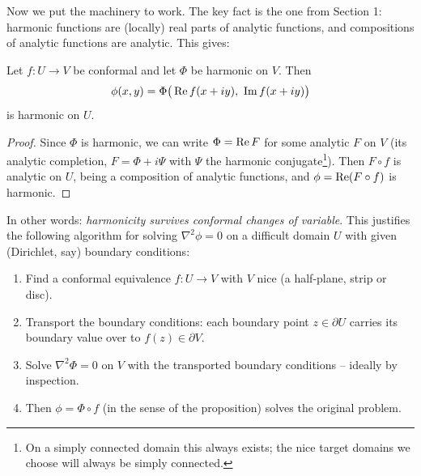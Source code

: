 \documentclass[a4paper]{scrartcl}
\begin{document}
Now we put the machinery to work. The key fact is the one from Section 1: harmonic functions are (locally) real parts of analytic functions, and compositions of analytic functions are analytic. This gives:

\begin{proposition}
	Let $f : U \to V$ be conformal and let $\Phi$ be harmonic on $V$. Then
	$$
	\phi(x, y) = \Phi\big(\re f(x + iy),\ \im f(x + iy)\big)
	$$
	is harmonic on $U$.
\end{proposition}
\begin{proof}
	Since $\Phi$ is harmonic, we can write $\Phi = \operatorname{Re} F$ for some analytic $F$ on $V$ (its analytic completion, $F = \Phi + i\Psi$ with $\Psi$ the harmonic conjugate\footnote{On a simply connected domain this always exists; the nice target domains we choose will always be simply connected.}). Then $F \circ f$ is analytic on $U$, being a composition of analytic functions, and $\phi = \operatorname{Re}(F \circ f)$ is harmonic.
\end{proof}

In other words: \emph{harmonicity survives conformal changes of variable}. This justifies the following algorithm for solving $\nabla^2 \phi = 0$ on a difficult domain $U$ with given (Dirichlet, say) boundary conditions:
\begin{enumerate}
	\item Find a conformal equivalence $f : U \to V$ with $V$ nice (a half-plane, strip or disc).
	\item Transport the boundary conditions: each boundary point $z \in \partial U$ carries its boundary value over to $f(z) \in \partial V$.
	\item Solve $\nabla^2 \Phi = 0$ on $V$ with the transported boundary conditions -- ideally by inspection.
	\item Then $\phi = \Phi \circ f$ (in the sense of the proposition) solves the original problem.
\end{enumerate}
\end{document}
